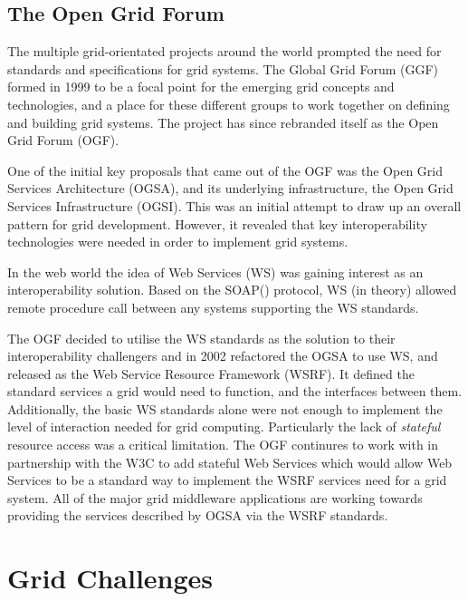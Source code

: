 \subsection{The Open Grid Forum}

The multiple grid-orientated projects around the world prompted the need for
standards and specifications for grid systems. The Global Grid Forum
(GGF)\cite{grid-ggf-www} formed in 1999 to be a focal point for the emerging
grid concepts and technologies, and a place for these different groups to work
together on defining and building grid systems. The project has since rebranded
itself as the Open Grid Forum (OGF).

One of the initial key proposals that came out of the OGF was the Open Grid
Services Architecture (OGSA)\cite{grid-foster05-ogsa}, and its underlying
infrastructure, the Open Grid Services Infrastructure
(OGSI)\cite{grid-tuecke05-ogsi}. This was an initial attempt to draw up an
overall pattern for grid development. However, it revealed that key
interoperability technologies were needed in order to implement grid systems.

In the web world the idea of Web Services (WS)\cite{grid-ws-www} was gaining
interest as an interoperability solution. Based on the
SOAP(\cite{grid-soap-www}) protocol, WS (in theory) allowed remote procedure
call between any systems supporting the WS standards.

The OGF decided to utilise the WS standards as the solution to their
interoperability challengers and in 2002 refactored the OGSA to use
WS\cite{grid-czajkowski04-refactor}, and released as the Web Service Resource
Framework (WSRF)\cite{grid-czajkowski04-wsrf}.  It defined the standard
services a grid would need to function, and the interfaces between them. 
Additionally, the basic WS standards alone were not enough to implement the level of
interaction needed for grid computing. Particularly the lack of
\textit{stateful} resource access was a critical limitation. The OGF continures
to work with in partnership with the W3C\cite{grid-w3c-www} to add stateful Web
Services which would allow Web Services to be a standard way to implement the
WSRF services need for a grid system. All of the major grid middleware
applications are working towards providing the services described by OGSA via
the WSRF standards.




\section{Grid Challenges}


